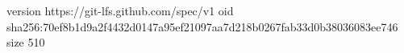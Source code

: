 version https://git-lfs.github.com/spec/v1
oid sha256:70ef8b1d9a2f4432d0147a95ef21097aa7d218b0267fab33d0b38036083ee746
size 510
